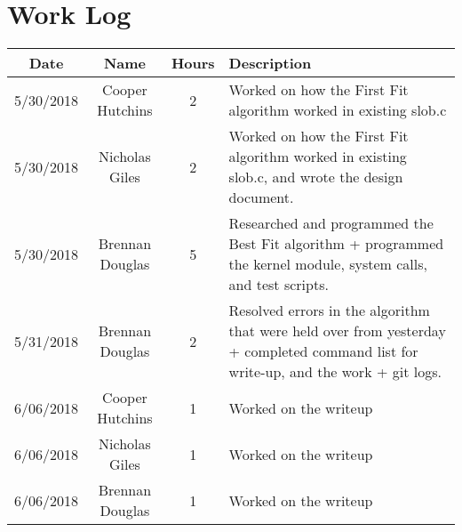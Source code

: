 \documentclass[onecolumn, draftclsnofoot,10pt, compsoc]{IEEEtran}
\begin{document}
\section{Work Log}

\begin{center}
	\begin{tabular}{ |c|c|c|p{12cm}| }
	    \hline
	    \textbf{Date} & \textbf{Name} & \textbf{Hours} & \textbf{Description}\\\hline
	    5/30/2018   & Cooper Hutchins   & 2 & Worked on how the First Fit algorithm worked in existing slob.c\\\hline
	    5/30/2018   & Nicholas Giles    & 2 & Worked on how the First Fit algorithm worked in existing slob.c, and wrote the design document.\\\hline
	    5/30/2018   & Brennan Douglas   & 5 & Researched and programmed the Best Fit algorithm + programmed the kernel module, system calls, and test scripts.\\\hline
	    5/31/2018   & Brennan Douglas   & 2 & Resolved errors in the algorithm that were held over from yesterday + completed command list for write-up, and the work + git logs.\\\hline
	    6/06/2018   & Cooper Hutchins   & 1 & Worked on the writeup\\\hline
	    6/06/2018   & Nicholas Giles    & 1 & Worked on the writeup\\\hline
	    6/06/2018   & Brennan Douglas   & 1 & Worked on the writeup\\\hline
    \end{tabular}
\end{center}



\end{document}
